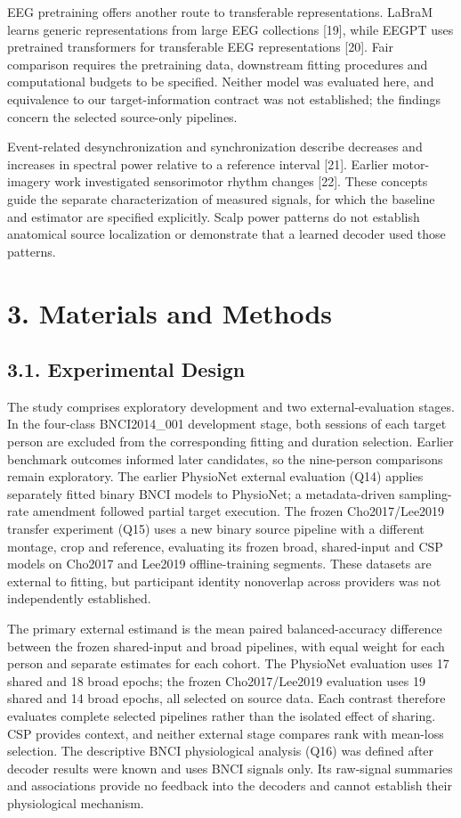 \documentclass[11pt]{article}
\begin{document}
EEG pretraining offers another route to transferable representations. LaBraM learns generic representations from large EEG collections [19], while EEGPT uses pretrained transformers for transferable EEG representations [20]. Fair comparison requires the pretraining data, downstream fitting procedures and computational budgets to be specified. Neither model was evaluated here, and equivalence to our target-information contract was not established; the findings concern the selected source-only pipelines.

Event-related desynchronization and synchronization describe decreases and increases in spectral power relative to a reference interval [21]. Earlier motor-imagery work investigated sensorimotor rhythm changes [22]. These concepts guide the separate characterization of measured signals, for which the baseline and estimator are specified explicitly. Scalp power patterns do not establish anatomical source localization or demonstrate that a learned decoder used those patterns.

\section*{3. Materials and Methods}
\subsection*{3.1. Experimental Design}
The study comprises exploratory development and two external-evaluation stages. In the four-class BNCI2014\_001 development stage, both sessions of each target person are excluded from the corresponding fitting and duration selection. Earlier benchmark outcomes informed later candidates, so the nine-person comparisons remain exploratory. The earlier PhysioNet external evaluation (Q14) applies separately fitted binary BNCI models to PhysioNet; a metadata-driven sampling-rate amendment followed partial target execution. The frozen Cho2017/Lee2019 transfer experiment (Q15) uses a new binary source pipeline with a different montage, crop and reference, evaluating its frozen broad, shared-input and CSP models on Cho2017 and Lee2019 offline-training segments. These datasets are external to fitting, but participant identity nonoverlap across providers was not independently established.

The primary external estimand is the mean paired balanced-accuracy difference between the frozen shared-input and broad pipelines, with equal weight for each person and separate estimates for each cohort. The PhysioNet evaluation uses 17 shared and 18 broad epochs; the frozen Cho2017/Lee2019 evaluation uses 19 shared and 14 broad epochs, all selected on source data. Each contrast therefore evaluates complete selected pipelines rather than the isolated effect of sharing. CSP provides context, and neither external stage compares rank with mean-loss selection. The descriptive BNCI physiological analysis (Q16) was defined after decoder results were known and uses BNCI signals only. Its raw-signal summaries and associations provide no feedback into the decoders and cannot establish their physiological mechanism.
\end{document}
